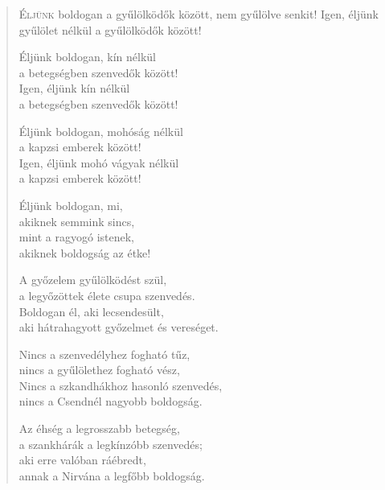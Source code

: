 
\begin{verse}

{\par%
\lettrine{É}{ljünk} {\LettrineTextFont boldogan a gyűlölködők között,}\newline
nem gyűlölve senkit!\newline
Igen, éljünk gyűlölet nélkül\verselinebreak
a gyűlölködők között!
\par}

 Éljünk boldogan, kín nélkül\\
a betegségben szenvedők között!\\
Igen, éljünk kín nélkül\\
a betegségben szenvedők között!

 Éljünk boldogan, mohóság nélkül\\
a kapzsi emberek között!\\
Igen, éljünk mohó vágyak nélkül\\
a kapzsi emberek között!

 Éljünk boldogan, mi,\\
akiknek semmink sincs,\\
mint a ragyogó istenek,\\
akiknek boldogság az étke!

 A győzelem gyűlölködést szül,\\
a legyőzöttek élete csupa szenvedés.\\
Boldogan él, aki lecsendesült,\\
aki hátrahagyott győzelmet és vereséget.

 Nincs a szenvedélyhez fogható tűz,\\
nincs a gyűlölethez fogható vész,\\
Nincs a szkandhákhoz hasonló szenvedés,\\
nincs a Csendnél nagyobb boldogság.

 Az éhség a legrosszabb betegség,\\
a szankhárák a legkínzóbb szenvedés;\\
aki erre valóban ráébredt,\\
annak a Nirvána a legfőbb boldogság.


\end{verse}
